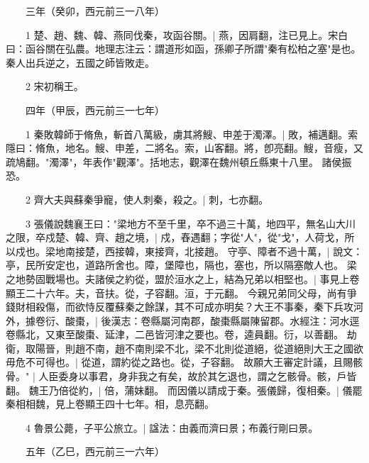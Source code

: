 　　三年（癸卯，西元前三一八年）

　　1 楚、趙、魏、韓、燕同伐秦，攻函谷關。|{
	燕，因肩翻，注已見上。宋白曰：函谷關在弘農。地理志注云：謂道形如函，孫卿子所謂"秦有松柏之塞"是也。
	}
秦人出兵逆之，五國之師皆敗走。

　　2 宋初稱王。

　　四年（甲辰，西元前三一七年）

　　1 秦敗韓師于脩魚，斬首八萬級，虜其將䱸、申差于濁澤。|{
	敗，補邁翻。索隱曰：脩魚，地名。䱸、申差，二將名。索，山客翻。將，卽亮翻。䱸，音瘦，又疏鳩翻。"濁澤"，年表作"觀澤"。括地志，觀澤在魏州頓丘縣東十八里。
	}
諸侯振恐。

　　2 齊大夫與蘇秦爭寵，使人刺秦，殺之。|{
	刺，七亦翻。
	}

　　3 張儀說魏襄王曰："梁地方不至千里，卒不過三十萬，地四平，無名山大川之限，卒戍楚、韓、齊、趙之境，|{
	戍，舂遇翻；字從"人"，從"戈"，人荷戈，所以戍也。梁地南接楚，西接韓，東接齊，北接趙。
	}
守亭、障者不過十萬，|{
	說文：亭，民所安定也，道路所舍也。障，堡障也，隔也，塞也，所以隔塞敵人也。
	}
梁之地勢固戰場也。夫諸侯之約從，盟於洹水之上，結為兄弟以相堅也。|{
	事見上卷顯王二十六年。夫，音扶。從，子容翻。洹，于元翻。
	}
今親兄弟同父母，尚有爭錢財相殺傷，而欲恃反覆蘇秦之餘謀，其不可成亦明矣？大王不事秦，秦下兵攻河外，據卷衍、酸棗，|{
	後漢志：卷縣屬河南郡，酸棗縣屬陳留郡。水經注：河水逕卷縣北，又東至酸棗、延津，二邑皆河津之要也。卷，逵員翻。衍，以善翻。
	}
劫衛，取陽晉，則趙不南，趙不南則梁不北，梁不北則從道絕，從道絕則大王之國欲毋危不可得也。|{
	從道，謂約從之路也。從，子容翻。
	}
故願大王審定計議，且賜骸骨。" |{
	人臣委身以事君，身非我之有矣，故於其乞退也，謂之乞骸骨。骸，戶皆翻。
	}
魏王乃倍從約，|{
	倍，蒲妹翻。
	}
而因儀以請成于秦。張儀歸，復相秦。|{
	儀罷秦相相魏，見上卷顯王四十七年。相，息亮翻。
	}

　　4 魯景公薨，子平公旅立。|{
	諡法：由義而濟曰景；布義行剛曰景。
	}

　　五年（乙巳，西元前三一六年）

